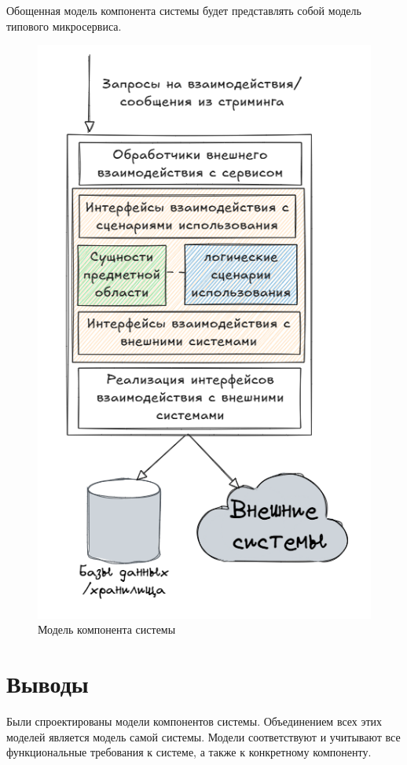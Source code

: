 Обощенная модель компонента системы будет представлять собой модель типового микросервиса.

\begin{figure}[H]%
	\begin{center}
		\includegraphics[width=.6\columnwidth]{./img/new/component_model.png}%
	\end{center}
	\caption{Модель компонента системы}%
	\label{pic:component_model}%
\end{figure}

\section{Выводы}

Были спроектированы модели компонентов системы. Объединением всех этих моделей является
модель самой системы. Модели соответствуют и учитывают все функциональные требования к системе, а также к конкретному компоненту.


